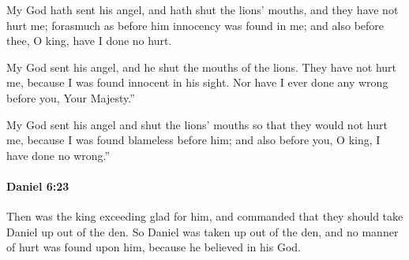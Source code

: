 			\begin{versebox}
					\item[BHS] 
					\item[LXX] 
					\item[ASV] My God hath sent his angel, and hath shut the lions' mouths, and they have not hurt me; forasmuch as before him innocency was found in me; and also before thee, O king, have I done no hurt.
					\item[NIV] My God sent his angel, and he shut the mouths of the lions. They have not hurt me, because I was found innocent in his sight. Nor have I ever done any wrong before you, Your Majesty.”
					\item[NRSV] My God sent his angel and shut the lions’ mouths so that they would not hurt me, because I was found blameless before him; and also before you, O king, I have done no wrong.”
			\end{versebox}

		\paragraph{Daniel 6:23} %
			\label{DANIEL-6-23}

			Then was the king exceeding glad for him, and commanded that they should take Daniel up out of the den. So Daniel was taken up out of the den, and no manner of hurt was found upon him, because he believed in his God.

